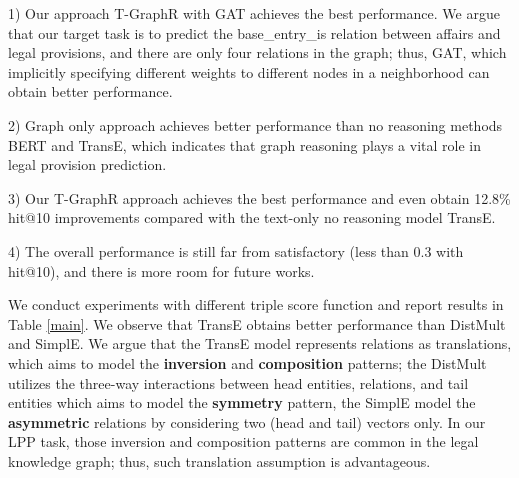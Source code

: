 \documentclass[runningheads]{llncs}
\begin{document}
1) Our approach T-GraphR with GAT achieves the best performance. We argue that our target task is to predict the base\_entry\_is relation between affairs and legal provisions, and there are only four relations in the graph; thus, GAT, which implicitly specifying different weights to different nodes in a neighborhood can obtain better performance. 



2) Graph only approach achieves better performance than no reasoning methods BERT and TransE, %
which indicates that graph reasoning plays a vital role in legal provision prediction. 

3) Our T-GraphR approach achieves the best performance and even obtain 12.8\% hit@10 improvements compared with the text-only no reasoning model TransE.

4) The overall performance is still far from satisfactory (less than 0.3 with hit@10), and there is more room for future works.

We conduct experiments with different triple score function and report results in Table \ref{main}. We observe that TransE obtains better performance than DistMult and SimplE. We argue that the TransE model represents relations as translations, which aims to model the \textbf{inversion} and \textbf{composition} patterns;  the DistMult utilizes the three-way interactions between head entities, relations, and tail entities which aims to model the \textbf{symmetry} pattern, the SimplE model the \textbf{asymmetric} relations by considering two (head and tail) vectors only. In our LPP task, those inversion and composition patterns are common in the legal knowledge graph; thus, such translation assumption is advantageous.
\iffalse
\end{document}

